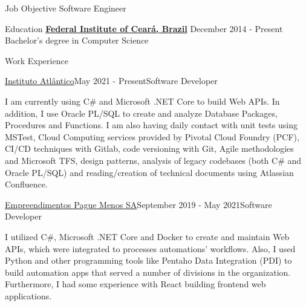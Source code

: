 \documentclass{resume} %
\begin{document}
    \begin{rSection}{Job Objective}
        Software Engineer
    \end{rSection}

    \begin{rSection}{Education}
        {\bf \href{https://ifce.edu.br/}{Federal Institute of Ceará, Brazil}} \hfill { December 2014 - Present} 
        \\ Bachelor's degree in Computer Science
    \end{rSection}

    \begin{rSection}{Work Experience}
        \begin{rSubsection}{\href{https://www.linkedin.com/company/Instituto-atlantico/}{Instituto Atlântico}}{May 2021 - Present}{Software Developer}{}
            \item I am currently using C\# and Microsoft .NET Core to build Web APIs. In addition, I use Oracle PL/SQL to create and analyze Database Packages, Procedures and Functions. I am also having daily contact with unit tests using MSTest, Cloud Computing services provided by Pivotal Cloud Foundry (PCF), CI/CD techniques with Gitlab, code versioning with Git, Agile methodologies and Microsoft TFS, design patterns, analysis of legacy codebases (both C\# and Oracle PL/SQL) and reading/creation of technical documents using Atlassian Confluence.
        \end{rSubsection}
        \begin{rSubsection}{\href {https://www.linkedin.com/company/empreendimentos-pague-menos-sa/}{Empreendimentos Pague Menos SA}}{September 2019 - May 2021}{Software Developer}{}
            \item I utilized C\#, Microsoft .NET Core and Docker to create and maintain Web APIs, which were integrated to processes automations' workflows. Also, I used Python and other programming tools like Pentaho Data Integration (PDI) to build automation apps that served a number of divisions in the organization. Furthermore, I had some experience with React building frontend web applications.
        \end{rSubsection}
    \end{rSection}
\end{document}
